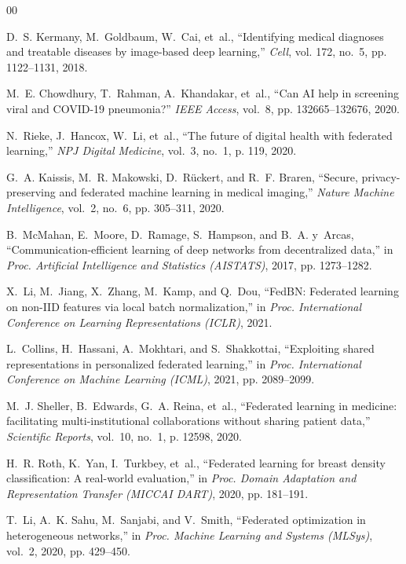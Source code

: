 \documentclass[conference]{IEEEtran}
\renewenvironment{thebibliography}[1]{
  \begin{oldthebibliography}{#1}
    \footnotesize
    \setlength{\itemsep}{0.4pt plus 0.2pt}
    \setlength{\parskip}{0pt}
}{
  \end{oldthebibliography}
}
\begin{document}
\begin{thebibliography}{00}
D.~S. Kermany, M.~Goldbaum, W.~Cai, et~al., ``Identifying medical diagnoses and treatable diseases by image-based deep learning,'' \emph{Cell}, vol. 172, no.~5, pp. 1122--1131, 2018.

M.~E. Chowdhury, T.~Rahman, A.~Khandakar, et~al., ``Can AI help in screening viral and COVID-19 pneumonia?'' \emph{IEEE Access}, vol.~8, pp. 132665--132676, 2020.

N.~Rieke, J.~Hancox, W.~Li, et~al., ``The future of digital health with federated learning,'' \emph{NPJ Digital Medicine}, vol.~3, no.~1, p. 119, 2020.

G.~A. Kaissis, M.~R. Makowski, D.~R{\"u}ckert, and R.~F. Braren, ``Secure, privacy-preserving and federated machine learning in medical imaging,'' \emph{Nature Machine Intelligence}, vol.~2, no.~6, pp. 305--311, 2020.

B.~McMahan, E.~Moore, D.~Ramage, S.~Hampson, and B.~A. y~Arcas, ``Communication-efficient learning of deep networks from decentralized data,'' in \emph{Proc. Artificial Intelligence and Statistics (AISTATS)}, 2017, pp. 1273--1282.

X.~Li, M.~Jiang, X.~Zhang, M.~Kamp, and Q.~Dou, ``FedBN: Federated learning on non-IID features via local batch normalization,'' in \emph{Proc. International Conference on Learning Representations (ICLR)}, 2021.

L.~Collins, H.~Hassani, A.~Mokhtari, and S.~Shakkottai, ``Exploiting shared representations in personalized federated learning,'' in \emph{Proc. International Conference on Machine Learning (ICML)}, 2021, pp. 2089--2099.

M.~J. Sheller, B.~Edwards, G.~A. Reina, et~al., ``Federated learning in medicine: facilitating multi-institutional collaborations without sharing patient data,'' \emph{Scientific Reports}, vol.~10, no.~1, p. 12598, 2020.

H.~R. Roth, K.~Yan, I.~Turkbey, et~al., ``Federated learning for breast density classification: A real-world evaluation,'' in \emph{Proc. Domain Adaptation and Representation Transfer (MICCAI DART)}, 2020, pp. 181--191.

T.~Li, A.~K. Sahu, M.~Sanjabi, and V.~Smith, ``Federated optimization in heterogeneous networks,'' in \emph{Proc. Machine Learning and Systems (MLSys)}, vol.~2, 2020, pp. 429--450.


\end{thebibliography}
\end{document}
